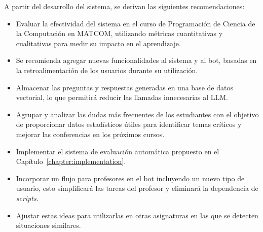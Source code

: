 \begin{recomendations}
    A partir del desarrollo del sistema, se derivan las siguientes recomendaciones:

    \begin{itemize}
        \item Evaluar la efectividad del sistema en el curso de Programación de Ciencia de la Computación en \mbox{MATCOM}, utilizando métricas cuantitativas y cualitativas para medir su impacto en el aprendizaje.
        
        \item Se recomienda agregar nuevas funcionalidades al sistema y al bot, basadas en la retroalimentación de los usuarios durante su utilización.
        
        \item Almacenar las preguntas y respuestas generadas en una base de datos vectorial, lo que permitirá reducir las llamadas innecesarias al LLM.
    
        \item Agrupar y analizar las dudas más frecuentes de los estudiantes con el objetivo de proporcionar datos estadísticos útiles para identificar temas críticos y mejorar las conferencias en los próximos cursos.
        
        \item Implementar el sistema de evaluación automática propuesto en el Capítulo~\ref{chapter:implementation}.
        
        \item Incorporar un flujo para profesores en el bot incluyendo un nuevo tipo de usuario, esto simplificará las tareas del profesor y eliminará la dependencia de \textit{scripts}.
        
        \item Ajustar estas ideas para utilizarlas en otras asignaturas en las que se detecten situaciones similares.
    \end{itemize}
\end{recomendations}
